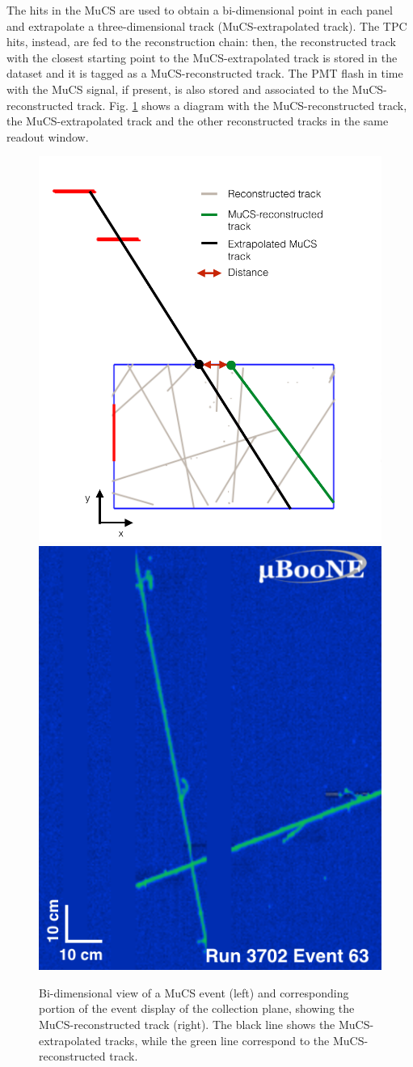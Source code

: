 \documentclass[a4paper]{scrartcl}
\begin{document}
The hits in the MuCS are used to obtain a bi-dimensional point in each panel and extrapolate a three-dimensional track (MuCS-extrapolated track). The TPC hits, instead, are fed to the reconstruction chain: then, the reconstructed track with the closest starting point to the MuCS-extrapolated track is stored in the dataset and it is tagged as a MuCS-reconstructed track. The PMT flash in time with the MuCS signal, if present, is also stored and associated to the MuCS-reconstructed track.  Fig. \ref{fig:evd} shows a diagram with the MuCS-reconstructed track, the MuCS-extrapolated track and the other reconstructed tracks in the same readout window.
\begin{figure}[htbp]
  \begin{center}
  \includegraphics[width=0.50\linewidth]{figures/evd.pdf}  \vspace{1.8em}\includegraphics[width=0.40\linewidth]{figures/evd_display.png}

  \caption{Bi-dimensional view of a MuCS event (left) and corresponding portion of the event display of the collection plane, showing the MuCS-reconstructed track (right). The black line shows the MuCS-extrapolated tracks, while the green line correspond to the MuCS-reconstructed track.} \label{fig:evd}
\end{center}
\end{figure}
\end{document}
